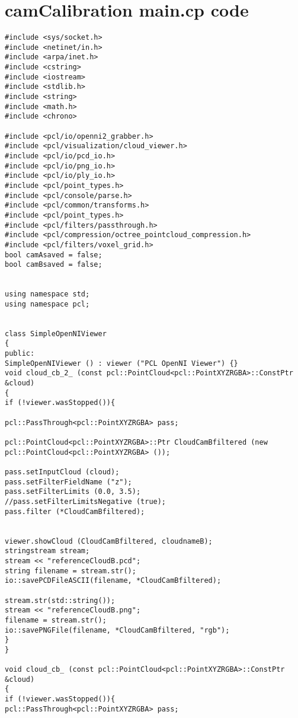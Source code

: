 \chapter{camCalibration main.cp \- code}
\label{app:camCalibration}


\begin{lstlisting}[frame = single, label={lst:cppread1}]
#include <sys/socket.h>
#include <netinet/in.h>
#include <arpa/inet.h>
#include <cstring>
#include <iostream>
#include <stdlib.h>
#include <string>
#include <math.h>
#include <chrono>

#include <pcl/io/openni2_grabber.h>
#include <pcl/visualization/cloud_viewer.h>
#include <pcl/io/pcd_io.h>
#include <pcl/io/png_io.h>
#include <pcl/io/ply_io.h>
#include <pcl/point_types.h>
#include <pcl/console/parse.h>
#include <pcl/common/transforms.h>
#include <pcl/point_types.h>
#include <pcl/filters/passthrough.h>
#include <pcl/compression/octree_pointcloud_compression.h>
#include <pcl/filters/voxel_grid.h>
bool camAsaved = false;
bool camBsaved = false;


using namespace std;
using namespace pcl;


class SimpleOpenNIViewer
{
public:
SimpleOpenNIViewer () : viewer ("PCL OpenNI Viewer") {}
void cloud_cb_2_ (const pcl::PointCloud<pcl::PointXYZRGBA>::ConstPtr &cloud)
{
if (!viewer.wasStopped()){

pcl::PassThrough<pcl::PointXYZRGBA> pass;

pcl::PointCloud<pcl::PointXYZRGBA>::Ptr CloudCamBfiltered (new pcl::PointCloud<pcl::PointXYZRGBA> ());

pass.setInputCloud (cloud);
pass.setFilterFieldName ("z");
pass.setFilterLimits (0.0, 3.5);
//pass.setFilterLimitsNegative (true);
pass.filter (*CloudCamBfiltered);


viewer.showCloud (CloudCamBfiltered, cloudnameB);
stringstream stream;
stream << "referenceCloudB.pcd";
string filename = stream.str();
io::savePCDFileASCII(filename, *CloudCamBfiltered);

stream.str(std::string());
stream << "referenceCloudB.png";
filename = stream.str();
io::savePNGFile(filename, *CloudCamBfiltered, "rgb");
}
}

void cloud_cb_ (const pcl::PointCloud<pcl::PointXYZRGBA>::ConstPtr &cloud)
{
if (!viewer.wasStopped()){
pcl::PassThrough<pcl::PointXYZRGBA> pass;


\end{lstlisting}
